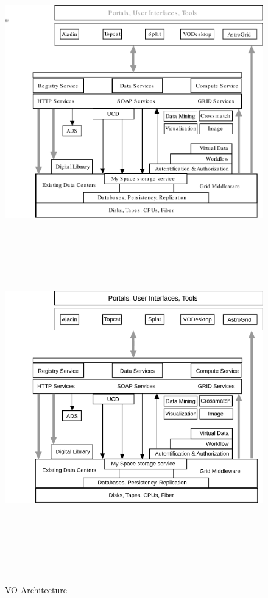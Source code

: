  
    \begin{figure}[!htbp]
      \begin{center}
        \leavevmode
        \ifpdf
        \includegraphics[scale = 1]{architecture}
        \else
        \includegraphics[bb = 92 86 545 742, height=6in]{architecture.png}
        \fi
        \caption{VO Architecture}
        \label{FigArchitecture}
      \end{center}
    \end{figure}

